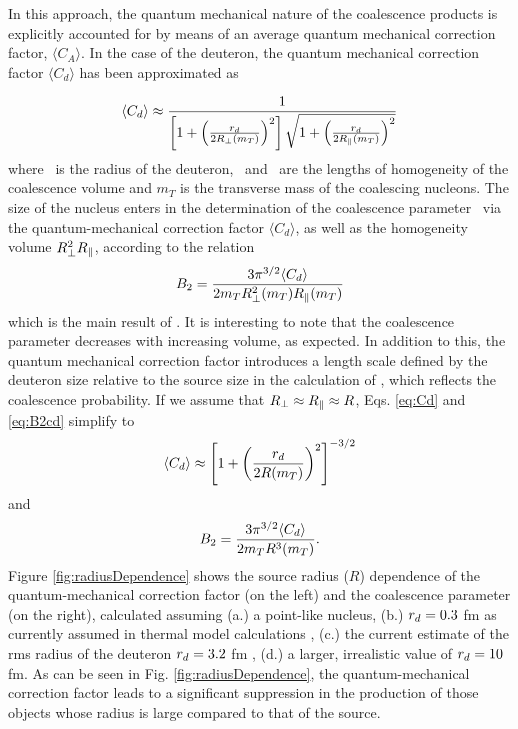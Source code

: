\documentclass[a4paper,11pt]{scrartcl} %
\begin{document}
In this approach, the quantum mechanical nature of the coalescence products is explicitly accounted for by means of an average quantum mechanical correction factor, $\langle C_{A} \rangle$. In the case of the deuteron, the quantum mechanical correction factor $\langle C_{d} \rangle$ has been approximated as 

\begin{equation}
\langle C_{d} \rangle \approx \frac{1}{\left[1+ \left(\frac{r_{d}}{2R_{\perp}(m_{T})}\right)^{2}\right] \sqrt{1+ \left(\frac{r_{d}}{2R_{\|}(m_{T})}\right)^{2}}}
\label{eq:Cd}
\end{equation}
%
where \dradius~is the radius of the deuteron, \rperp~and \rpar~are the lengths of homogeneity of the coalescence volume and $m_{T}$ is the transverse mass of the coalescing nucleons.
The size of the nucleus enters in the determination of the coalescence parameter \btwo~via the quantum-mechanical correction factor $\langle C_{d} \rangle$, as well as the homogeneity volume $R_{\perp}^{2}R_{\|}$, according to the relation
%
\begin{equation}
B_{2} = \frac{3\pi^{3/2} \langle C_{d} \rangle}{2m_{T}R_{\perp}^{2}(m_{T})R_{\|}(m_{T})}
\label{eq:B2cd}
\end{equation}
%
which is the main result of \cite{Scheibl:1998tk}. It is interesting to note that the coalescence parameter decreases with increasing volume, as expected. In addition to this, the quantum mechanical correction factor introduces a length scale defined by the deuteron size relative to the source size in the calculation of \btwo, which reflects the coalescence probability. 
If we assume that  $R_{\perp} \approx R_{\|} \approx R$, Eqs. \ref{eq:Cd} and \ref{eq:B2cd} simplify to 
\begin{equation}
\langle C_{d} \rangle \approx \left[1+ \left(\frac{r_{d}}{2R(m_{T})}\right)^{2}\right]^{-3/2}
\label{eq:Cdapprox}
\end{equation}
%
and
%
\begin{equation}
B_{2} = \frac{3\pi^{3/2} \langle C_{d} \rangle}{2m_{T}R^{3}(m_{T})}.
\label{eq:B2approx}
\end{equation}
%
Figure \ref{fig:radiusDependence} shows the source radius ($R$) dependence of the quantum-mechanical correction factor (on the left) and the coalescence parameter \btwo (on the right), calculated assuming (a.) a point-like nucleus, (b.) $r_{d} = 0.3$ fm as currently assumed in thermal model calculations \cite{Andronic:2016nof}, (c.) the current estimate of the rms radius of the deuteron $r_{d} = 3.2$ fm \cite{Mohr:2015ccw}, (d.) a larger, irrealistic value of  $r_{d} = 10$ fm. 
As can be seen in Fig. \ref{fig:radiusDependence}, the quantum-mechanical correction factor leads to a significant suppression in the production of those objects whose radius is large compared to that of the source.
\end{document}
